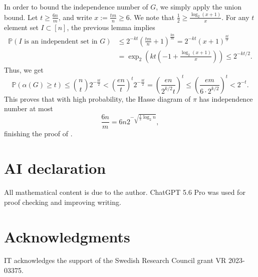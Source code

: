 \documentclass[11pt]{article}
\theoremstyle{definition}
\begin{document}
In order to bound the independence number of $G$, we simply apply the union bound. Let $t\geq \frac{6n}{m}$, and write $x:=\frac{tm}{n}\geq 6$. We note that $\frac{1}{2}\geq  \frac{\log_2 (x+1)}{x}$. For any $t$ element set $I\subset [n]$, the previous lemma implies 
\begin{align*}
\mathbb{P}(I\text{ is an independent set in }G)&\leq 2^{-kt}\left(\frac{tm}{n}+1\right)^{\frac{kn}{m}}=2^{-kt}(x+1)^{\frac{kt}{x}}\\
&=\exp_2\left(kt\left(-1+\frac{\log_2(x+1)}{x}\right)\right)\leq 2^{-kt/2}.
\end{align*}
Thus, we get
$$\mathbb{P}(\alpha(G)\geq t)\leq \binom{n}{t}2^{-\frac{kt}{2}}< \left(\frac{en}{t}\right)^t2^{-\frac{kt}{2}}=\left(\frac{en}{2^{k/2} t}\right)^t\leq \left(\frac{em}{6\cdot 2^{k/2}}\right)^t<2^{-t}.$$
This proves that with high probability, the Hasse diagram of $\pi$ has independence number at most $$\frac{6n}{m}=6n2^{-\sqrt{\frac{1}{2}\log_2 n}},$$ finishing the proof of .



\section*{AI declaration}
\vspace{-10pt}
All mathematical content is due to the author. ChatGPT 5.6 Pro was used for proof checking and improving writing.

\section*{Acknowledgments}
\vspace{-10pt}
IT acknowledges the support of the Swedish Research Council grant VR 2023-03375.
\end{document}

